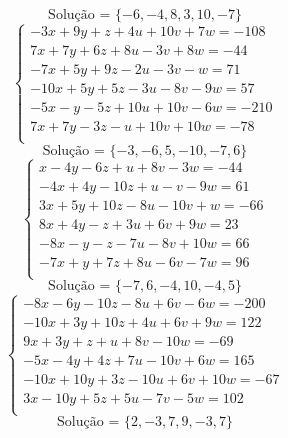 \documentclass[12pt,oneside,a4paper]{article}
\begin{document}
\begin{equation*}
\text{Solução = }\{-6,-4,8,3,10,-7\}
\end{equation*}
\vspace{\baselineskip}
\begin{equation*}
\begin{cases}
-3x+9y+z+4u+10v+7w=-108 \\
7x+7y+6z+8u-3v+8w=-44 \\
-7x+5y+9z-2u-3v-w=71 \\
-10x+5y+5z-3u-8v-9w=57 \\
-5x-y-5z+10u+10v-6w=-210 \\
7x+7y-3z-u+10v+10w=-78 \\
\end{cases}
\end{equation*}
\begin{equation*}
\text{Solução = }\{-3,-6,5,-10,-7,6\}
\end{equation*}
\vspace{\baselineskip}
\begin{equation*}
\begin{cases}
x-4y-6z+u+8v-3w=-44 \\
-4x+4y-10z+u-v-9w=61 \\
3x+5y+10z-8u-10v+w=-66 \\
8x+4y-z+3u+6v+9w=23 \\
-8x-y-z-7u-8v+10w=66 \\
-7x+y+7z+8u-6v-7w=96 \\
\end{cases}
\end{equation*}
\begin{equation*}
\text{Solução = }\{-7,6,-4,10,-4,5\}
\end{equation*}
\vspace{\baselineskip}
\begin{equation*}
\begin{cases}
-8x-6y-10z-8u+6v-6w=-200 \\
-10x+3y+10z+4u+6v+9w=122 \\
9x+3y+z+u+8v-10w=-69 \\
-5x-4y+4z+7u-10v+6w=165 \\
-10x+10y+3z-10u+6v+10w=-67 \\
3x-10y+5z+5u-7v-5w=102 \\
\end{cases}
\end{equation*}
\begin{equation*}
\text{Solução = }\{2,-3,7,9,-3,7\}
\end{equation*}
\end{document}
